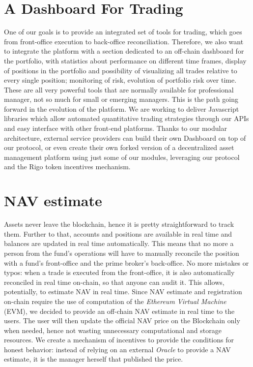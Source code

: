 \documentclass[9pt,oneside]{amsart}
\begin{document}
\begin{multicols}{2}
\section{A Dashboard For Trading} \label{ch:model}
One of our goals is to provide an integrated set of tools for trading, which goes from front-office execution to back-office reconciliation. Therefore, we also want to integrate the platform with a section dedicated to an off-chain dashboard for the portfolio, with statistics about performance on different time frames, display of positions in the portfolio and possibility of visualizing all trades relative to every single position; monitoring of risk, evolution of portfolio risk over time. These are all very powerful tools that are normally available for professional manager, not so much for small or emerging managers. This is the path going forward in the evolution of the platform.
We are working to deliver Javascript libraries which allow automated quantitative trading strategies through our APIs and easy interface with other front-end platforms.
Thanks to our modular architecture, external service providers can build their own Dashboard on top of our protocol, or even create their own forked version of a decentralized asset management platform using just some of our modules, leveraging our protocol and the Rigo token incentives mechanism.

\section{NAV estimate} \label{ch:ghost}

Assets never leave the blockchain, hence it is pretty straightforward to track them. Further to that, accounts and positions are available in real time and balances are updated in real time automatically. This means that no more a person from the fund's operations will have to manually reconcile the position with a fund's front-office and the prime broker's back-office. No more mistakes or typos: when a trade is executed from the front-office, it is also automatically reconciled in real time on-chain, so that anyone can audit it. This allows, potentially, to estimate NAV in real time.
Since NAV estimate and registration on-chain require the use of computation of the \textit{Ethereum Virtual Machine} (EVM), we decided to provide an off-chain NAV estimate in real time to the users. The user will then update the official NAV price on the Blockchain only when needed, hence not wasting unnecessary computational and storage resources. We create a mechanism of incentives to provide the conditions for honest behavior: instead of relying on an external \textit{Oracle} to provide a NAV estimate, it is the manager herself that published the price.


\end{multicols}
\end{document}
